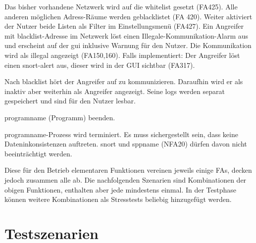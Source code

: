 \begin{description}[style=multiline, leftmargin=4cm, labelwidth=4cm]
   Das bisher vorhandene Netzwerk wird auf die \gls{whitelist} gesetzt (FA425). Alle anderen möglichen Adress-Räume werden geblacklistet (FA 420). Weiter aktiviert der Nutzer beide Listen als Filter im Einstellungsmenü (FA427). Ein Angreifer mit \gls{blacklist}-Adresse im Netzwerk löst einen Illegale-Kommunikation-Alarm aus und erscheint auf der \gls{gui} inklusive Warnung für den Nutzer. Die Kommunikation wird als illegal angezeigt (FA150,160). Falls implementiert: Der Angreifer löst einen \gls{snort}-\gls{alert} aus, dieser wird in der GUI sichtbar (FA317).
  
   Nach \gls{blacklist} hört der Angreifer auf zu kommunizieren. Daraufhin wird er als inaktiv aber weiterhin als Angreifer angezeigt. Seine \glspl{log} werden separat gespeichert und sind für den Nutzer lesbar.
  
   \gls{programname} (Programm) beenden.
  
   \gls{programname}-Prozess wird terminiert. Es muss sichergestellt sein, dass keine Dateninkonsistenzen auftreten. \gls{snort} und \gls{sppname} (NFA20) dürfen davon nicht beeinträchtigt werden.

\end{description}

\par
Diese für den Betrieb elementaren Funktionen vereinen jeweils einige FAs, decken jedoch zusammen alle ab. Die nachfolgenden Szenarien sind Kombinationen der obigen Funktionen, enthalten aber jede mindestens einmal. In der Testphase können weitere Kombinationen als Stresstests beliebig hinzugefügt werden.

\section{Testszenarien}

